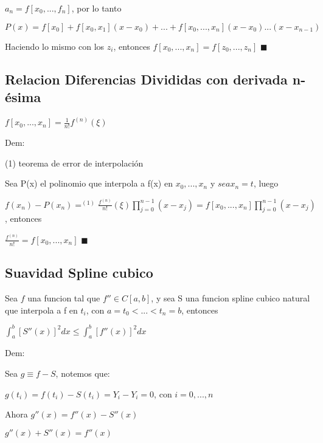 \documentclass{article}
\begin{document}
$a_n = f[x_0,...,f_n] $, por lo tanto 

$P(x) = f[x_0]+ f[x_0,x_1](x-x_0)+...+f[x_0,...,x_n](x-x_0)...(x-x_{n-1})$

Haciendo lo mismo con los $z_i$, entonces $f[x_0,...,x_n] = f[z_0,...,z_n]$ $\blacksquare$

\vspace{10mm}

\subsection{Relacion Diferencias Divididas con derivada n-ésima}\label{Relacion-DIf-Divididas-con-derivada-n-esima}

$f[x_0,...,x_n] = \displaystyle\frac{1}{n!}f^{(n)}(\xi)$

Dem:

(1) teorema de error de interpolación

Sea P(x) el polinomio que interpola a f(x) en $x_0,...,x_n$ y $sea x_n=t$, luego

\vspace{5mm}

$f(x_n)-P(x_n)=^{(1)}  \displaystyle\frac{f^{(n)}}{n!}(\xi) \prod\limits_{j=0}^{n-1}(x-x_j)=f[x_0,...,x_n]\prod\limits_{j=0}^{n-1}(x-x_j)$, entonces

$\displaystyle\frac{f^{(n)}}{n!} =f[x_0,...,x_n] $ $\blacksquare$
 

\vspace{10mm}



\subsection{Suavidad Spline cubico}\label{Suavidad-Spline-cubico}

Sea $f$ una funcion tal que $f''\in C[a,b]$, y sea S una funcion spline cubico natural que interpola a f en $t_i$, con $a=t_0<...<t_n=b$, entonces

$\displaystyle\int_{a}^{b}[S''(x)]^2dx \leq \displaystyle\int_{a}^{b}[f''(x)]^2dx$

Dem:

Sea $g \equiv f - S$, notemos que:

$g(t_i) = f(t_i)-S(t_i) = Y_i - Y_i = 0$, con $i = 0,...,n$

\vspace{5mm}

Ahora $g''(x) = f''(x) - S''(x)$

$g''(x) + S''(x) = f''(x)$
\end{document}
